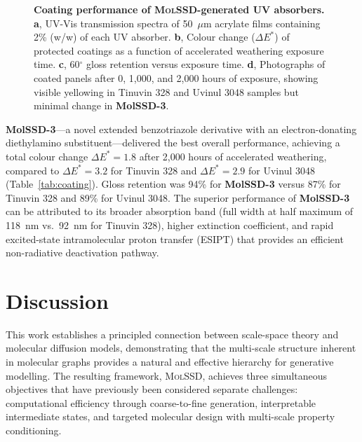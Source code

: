 \documentclass[11pt]{article}
\newcommand{\molssd}{\textsc{MolSSD}}
\begin{document}
\begin{figure}[t]
    \centering
    \caption{\textbf{Coating performance of \molssd{}-generated UV absorbers.} \textbf{a}, UV-Vis transmission spectra of 50~$\mu$m acrylate films containing 2\% (w/w) of each UV absorber. \textbf{b}, Colour change ($\Delta E^*$) of protected coatings as a function of accelerated weathering exposure time. \textbf{c}, 60$^\circ$ gloss retention versus exposure time. \textbf{d}, Photographs of coated panels after 0, 1{,}000, and 2{,}000 hours of exposure, showing visible yellowing in Tinuvin 328 and Uvinul 3048 samples but minimal change in \textbf{MolSSD-3}.}
    \label{fig:coating}
\end{figure}

\textbf{MolSSD-3}---a novel extended benzotriazole derivative with an electron-donating diethylamino substituent---delivered the best overall performance, achieving a total colour change $\Delta E^* = 1.8$ after 2{,}000 hours of accelerated weathering, compared to $\Delta E^* = 3.2$ for Tinuvin 328 and $\Delta E^* = 2.9$ for Uvinul 3048 (Table~\ref{tab:coating}). Gloss retention was 94\% for \textbf{MolSSD-3} versus 87\% for Tinuvin 328 and 89\% for Uvinul 3048. The superior performance of \textbf{MolSSD-3} can be attributed to its broader absorption band (full width at half maximum of 118~nm vs.\ 92~nm for Tinuvin 328), higher extinction coefficient, and rapid excited-state intramolecular proton transfer (ESIPT) that provides an efficient non-radiative deactivation pathway.


\section*{Discussion}

This work establishes a principled connection between scale-space theory and molecular diffusion models, demonstrating that the multi-scale structure inherent in molecular graphs provides a natural and effective hierarchy for generative modelling. The resulting framework, \molssd{}, achieves three simultaneous objectives that have previously been considered separate challenges: computational efficiency through coarse-to-fine generation, interpretable intermediate states, and targeted molecular design with multi-scale property conditioning.
\end{document}
